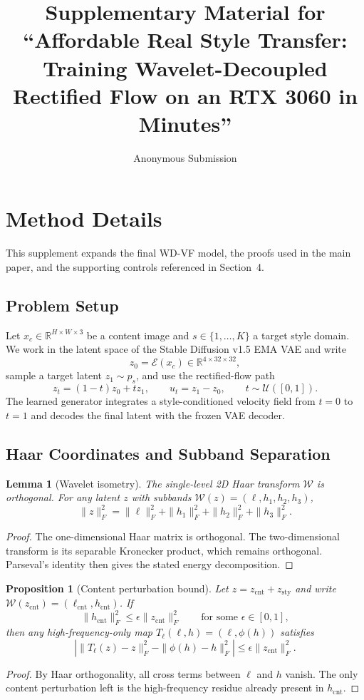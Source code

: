 \documentclass[10pt,letterpaper]{article}
\title{Supplementary Material for ``Affordable Real Style Transfer:\\
Training Wavelet-Decoupled Rectified Flow on an RTX 3060 in Minutes''}
\author{Anonymous Submission}
\date{}
\newtheorem*{slemma}{Lemma}
\newtheorem*{sproposition}{Proposition}
\begin{document}
\maketitle

\appendix

\section{Method Details}
\label{sec:method_details}

This supplement expands the final WD-VF model, the proofs used in the main paper, and the supporting controls referenced in Section~4.

\subsection{Problem Setup}
\label{sec:problem}

Let $x_c \in \mathbb{R}^{H \times W \times 3}$ be a content image and $s \in \{1,\ldots,K\}$ a target style domain. We work in the latent space of the Stable Diffusion v1.5 EMA VAE and write
\[
z_0 = \mathcal E(x_c) \in \mathbb{R}^{4 \times 32 \times 32},
\]
sample a target latent $z_1 \sim p_s$, and use the rectified-flow path
\[
z_t = (1-t)z_0 + tz_1,
\qquad
u_t = z_1 - z_0,
\qquad
t \sim \mathcal U([0,1]).
\]
The learned generator integrates a style-conditioned velocity field from $t=0$ to $t=1$ and decodes the final latent with the frozen VAE decoder.

\subsection{Haar Coordinates and Subband Separation}
\label{sec:haar}

\begin{slemma}[Wavelet isometry]
The single-level 2D Haar transform $\mathcal W$ is orthogonal. For any latent $z$ with subbands $\mathcal W(z) = (\ell,h_1,h_2,h_3)$,
\[
\|z\|_F^2 = \|\ell\|_F^2 + \|h_1\|_F^2 + \|h_2\|_F^2 + \|h_3\|_F^2.
\]
\end{slemma}
\begin{proof}
The one-dimensional Haar matrix is orthogonal. The two-dimensional transform is its separable Kronecker product, which remains orthogonal. Parseval's identity then gives the stated energy decomposition.
\end{proof}

\begin{sproposition}[Content perturbation bound]
Let $z=z_{\mathrm{cnt}}+z_{\mathrm{sty}}$ and write $\mathcal W(z_{\mathrm{cnt}})=(\ell_{\mathrm{cnt}},h_{\mathrm{cnt}})$. If
\[
\|h_{\mathrm{cnt}}\|_F^2 \le \epsilon \|z_{\mathrm{cnt}}\|_F^2
\qquad
\text{for some } \epsilon\in[0,1],
\]
then any high-frequency-only map $T_\ell(\ell,h)=(\ell,\phi(h))$ satisfies
\[
\left|
\|T_\ell(z)-z\|_F^2 - \|\phi(h)-h\|_F^2
\right|
\le \epsilon \|z_{\mathrm{cnt}}\|_F^2.
\]
\end{sproposition}
\begin{proof}
By Haar orthogonality, all cross terms between $\ell$ and $h$ vanish. The only content perturbation left is the high-frequency residue already present in $h_{\mathrm{cnt}}$.
\end{proof}
\end{document}
